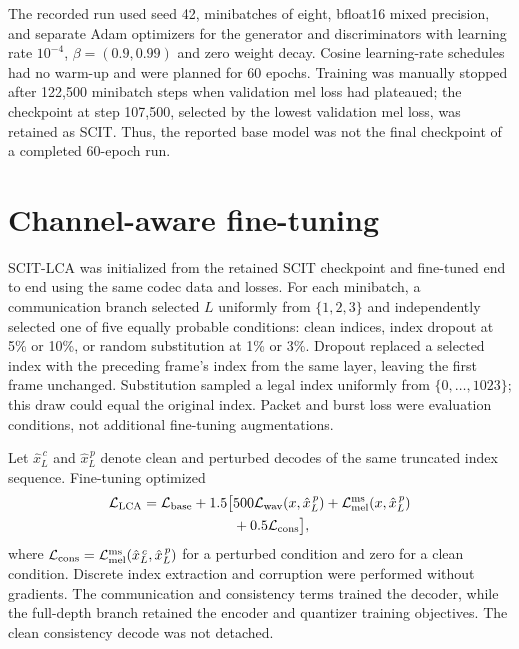 The recorded run used seed 42, minibatches of eight, bfloat16 mixed precision, and separate Adam optimizers for the generator and discriminators with learning rate $10^{-4}$, $\beta=(0.9,0.99)$ and zero weight decay. Cosine learning-rate schedules had no warm-up and were planned for 60 epochs. Training was manually stopped after 122,500 minibatch steps when validation mel loss had plateaued; the checkpoint at step 107,500, selected by the lowest validation mel loss, was retained as SCIT. Thus, the reported base model was not the final checkpoint of a completed 60-epoch run.

\section{Channel-aware fine-tuning}
SCIT-LCA was initialized from the retained SCIT checkpoint and fine-tuned end to end using the same codec data and losses. For each minibatch, a communication branch selected $L$ uniformly from $\{1,2,3\}$ and independently selected one of five equally probable conditions: clean indices, index dropout at 5\% or 10\%, or random substitution at 1\% or 3\%. Dropout replaced a selected index with the preceding frame's index from the same layer, leaving the first frame unchanged. Substitution sampled a legal index uniformly from $\{0,\ldots,1023\}$; this draw could equal the original index. Packet and burst loss were evaluation conditions, not additional fine-tuning augmentations.

Let $\hat{x}_{L}^{\,c}$ and $\hat{x}_{L}^{\,p}$ denote clean and perturbed decodes of the same truncated index sequence. Fine-tuning optimized
\begin{equation}
\begin{split}
 \mathcal L_{\rm LCA}
 =\mathcal L_{\rm base}
 +1.5\bigl[&
 500\mathcal L_{\rm wav}(x,\hat{x}_{L}^{\,p})
 +\mathcal L_{\rm mel}^{\rm ms}(x,\hat{x}_{L}^{\,p})\\
 &+0.5\mathcal L_{\rm cons}\bigr],
\end{split}
\end{equation}
where $\mathcal L_{\rm cons}=\mathcal L_{\rm mel}^{\rm ms}(\hat{x}_{L}^{\,c},\hat{x}_{L}^{\,p})$ for a perturbed condition and zero for a clean condition. Discrete index extraction and corruption were performed without gradients. The communication and consistency terms trained the decoder, while the full-depth branch retained the encoder and quantizer training objectives. The clean consistency decode was not detached.

